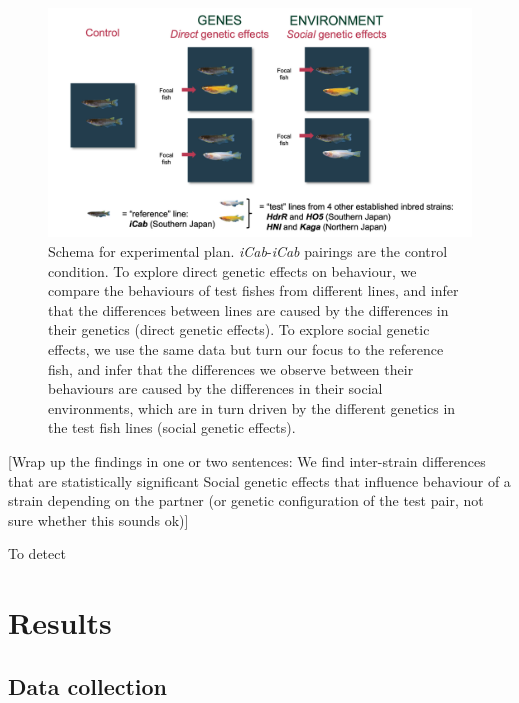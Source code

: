 \documentclass[
]{book}
\begin{document}
\begin{figure}
\includegraphics[width=1\linewidth]{figs/pilot/experimental_schema} \caption{Schema for experimental plan. \emph{iCab}-\emph{iCab} pairings are the control condition. To explore direct genetic effects on behaviour, we compare the behaviours of test fishes from different lines, and infer that the differences between lines are caused by the differences in their genetics (direct genetic effects). To explore social genetic effects, we use the same data but turn our focus to the reference fish, and infer that the differences we observe between their behaviours are caused by the differences in their social environments, which are in turn driven by the different genetics in the test fish lines (social genetic effects).}\label{fig:behavioural-schema}
\end{figure}

{[}Wrap up the findings in one or two sentences:
We find inter-strain differences that are statistically significant
Social genetic effects that influence behaviour of a strain depending on the partner (or genetic configuration of the test pair, not sure whether this sounds ok){]}

To detect

\hypertarget{results}{%
\section{Results}\label{results}}

\hypertarget{pilot-data-collection}{%
\subsection{Data collection}\label{pilot-data-collection}}
\end{document}
